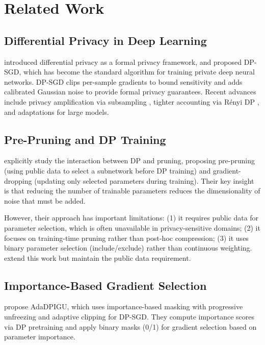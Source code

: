 \documentclass[11pt,a4paper]{article}
\begin{document}
\section{Related Work}

\subsection{Differential Privacy in Deep Learning}

\citet{dwork2006calibrating} introduced differential privacy as a formal privacy framework, and \citet{abadi2016deep} proposed DP-SGD, which has become the standard algorithm for training private deep neural networks. DP-SGD clips per-sample gradients to bound sensitivity and adds calibrated Gaussian noise to provide formal privacy guarantees. Recent advances include privacy amplification via subsampling \citep{balle2018privacy}, tighter accounting via R\'{e}nyi DP \citep{mironov2017renyi}, and adaptations for large models.

\subsection{Pre-Pruning and DP Training}

\citet{adamczewski2023prepruning} explicitly study the interaction between DP and pruning, proposing pre-pruning (using public data to select a subnetwork before DP training) and gradient-dropping (updating only selected parameters during training). Their key insight is that reducing the number of trainable parameters reduces the dimensionality of noise that must be added.

However, their approach has important limitations: (1) it requires public data for parameter selection, which is often unavailable in privacy-sensitive domains; (2) it focuses on training-time pruning rather than post-hoc compression; (3) it uses binary parameter selection (include/exclude) rather than continuous weighting. \citet{adamczewski2023differential} extend this work but maintain the public data requirement.

\subsection{Importance-Based Gradient Selection}

\citet{zhang2025adadpigu} propose AdaDPIGU, which uses importance-based masking with progressive unfreezing and adaptive clipping for DP-SGD. They compute importance scores via DP pretraining and apply binary masks (0/1) for gradient selection based on parameter importance.
\end{document}
